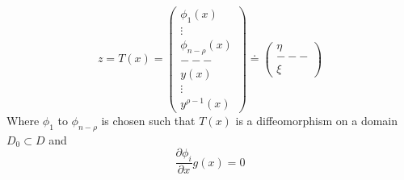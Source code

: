 \begin{equation}
        z = T(x) = 
        \begin{pmatrix}
                \phi_1(x) \\
                \vdots \\
                \phi_{n - \rho}(x) \\
                --- \\
                y(x) \\
                \vdots \\
                y^{\rho - 1}(x)
        \end{pmatrix}
        \doteq
        \begin{pmatrix}
                \eta \\
                --- \\
                \xi
        \end{pmatrix}
\end{equation}
Where $\phi_1$ to $\phi_{n - \rho}$ is chosen such that $T(x)$ is a diffeomorphism on a domain $D_0 \subset D$ and 
\begin{equation}
        \frac{\partial \phi_{i}}{\partial x}g(x) = 0
\end{equation}
